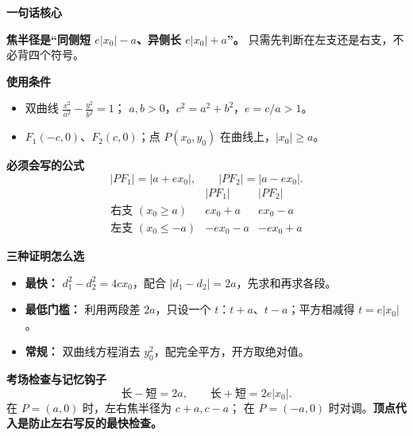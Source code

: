 \begin{summarybox}

\textbf{\textcolor{CSummary}{一句话核心}}

\textbf{焦半径是“同侧短 $e|x_0|-a$、异侧长 $e|x_0|+a$”。}
只需先判断在左支还是右支，不必背四个符号。

\medskip
\textbf{\textcolor{CSummary}{使用条件}}
\begin{itemize}[leftmargin=*,itemsep=0.3em,topsep=0.3em]
 \item 双曲线 $\frac{x^2}{a^2}-\frac{y^2}{b^2}=1$；
 $a,b>0$，$c^2=a^2+b^2$，$e=c/a>1$。
 \item $F_1(-c,0)$、$F_2(c,0)$；点 $P(x_0,y_0)$ 在曲线上，$|x_0|\ge a$。
\end{itemize}

\medskip
\textbf{\textcolor{CSummary}{必须会写的公式}}
\[
 \boxed{|PF_1|=|a+ex_0|},\qquad
 \boxed{|PF_2|=|a-ex_0|}.
\]
\[
 \begin{array}{c|cc}
  &|PF_1|&|PF_2|\\\hline
  \text{右支 }(x_0\ge a)&ex_0+a&ex_0-a\\
  \text{左支 }(x_0\le-a)&-ex_0-a&-ex_0+a
 \end{array}
\]

\medskip
\textbf{\textcolor{CSummary}{三种证明怎么选}}
\begin{itemize}[leftmargin=*,itemsep=0.35em,topsep=0.3em]
 \item \textbf{最快：} $d_1^2-d_2^2=4cx_0$，配合 $|d_1-d_2|=2a$，先求和再求各段。
 \item \textbf{最低门槛：} 利用两段差 $2a$，只设一个 $t$：$t+a$、$t-a$；平方相减得 $t=e|x_0|$。
 \item \textbf{常规：} 双曲线方程消去 $y_0^2$，配完全平方，开方取绝对值。
\end{itemize}

\medskip
\textbf{\textcolor{CSummary}{考场检查与记忆钩子}}
\[
 \boxed{\text{长}-\text{短}=2a},\qquad
 \boxed{\text{长}+\text{短}=2e|x_0|}.
\]
在 $P=(a,0)$ 时，左右焦半径为 $c+a,c-a$；
在 $P=(-a,0)$ 时对调。\textbf{顶点代入是防止左右写反的最快检查。}

\end{summarybox}
